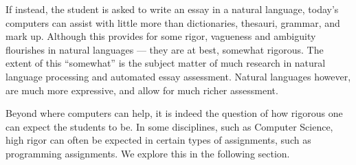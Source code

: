 If instead, the student is asked to write an essay in a natural language,
today's computers can assist with little more than dictionaries, thesauri,
grammar, and mark up. Although this provides for some rigor, vagueness and
ambiguity flourishes in natural languages --- they are at best, somewhat
rigorous.  The extent of this ``somewhat'' is the subject matter of much
research in natural language processing and automated essay
assessment\cite{valenti-et-al-2003}. Natural languages however, are much more
expressive, and allow for much richer assessment\cite{conole-warburton-2005}.

Beyond where computers can help, it is indeed the question of how rigorous one
can expect the students to be. In some disciplines, such as Computer Science,
high rigor can often be expected in certain types of assignments, such as
programming assignments. We explore this in the following section.














